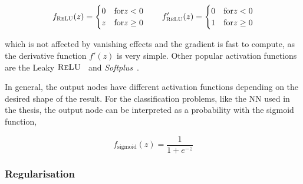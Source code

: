 \begin{align}
    f_\textsc{ReLU}(z)= \begin{cases}
            0& \text{for}  z<0 \\
            z& \text{for}  z\geq0\\
            \end{cases}\qquad f'_\textsc{ReLU}(z)= \begin{cases}
                0& \text{for}  z<0 \\
                1& \text{for}  z\geq0\\
                \end{cases}
\end{align}

which is not affected by vanishing effects and the gradient is fast to compute, as the derivative function $f'(z)$ is very simple. Other popular activation functions are the Leaky $\textsc{ReLU}$~\cite{lrelu} and \textit{Softplus}~\cite{Maas2013RectifierNI}.

In general, the output nodes have different activation functions depending on the desired shape of the result. For the classification problems, like the NN used in the thesis, the output node can be interpreted as a probability with the sigmoid function,

\begin{equation}
    f_\text{sigmoid}(z)=\frac{1}{1+e^{-z}}
\end{equation}

\subsubsection{Regularisation}

